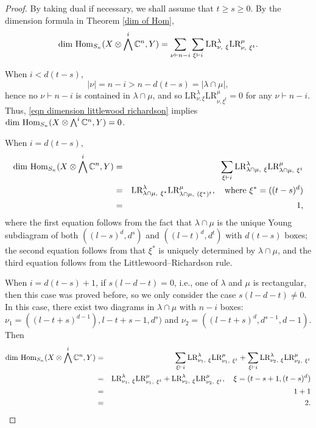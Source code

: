 \documentclass[11pt]{amsart}
\numberwithin{equation}{section}
\theoremstyle{definition}
\begin{document}
\begin{proof}
By taking dual if necessary, we shall assume that $t\geq s\geq 0$. By the dimension formula in Theorem \ref{dim of Hom},
    \begin{equation}
           \textnormal{dim}\ \textnormal{Hom}_{S_{n}}(X\otimes\bigwedge^{i}\mathbb{C}^{n}, Y)= \sum\limits_{\nu\vdash n-i}\sum\limits_{\xi\vdash i} \textnormal{LR}^{\lambda}_{\nu,\ \xi}\textnormal{LR}^{\mu}_{\nu,\ \xi^{t}}.
        \label{eqn dimension littlewood richardson}
        \end{equation}
        
When $i<d(t-s)$, 
\[ |\nu|=n-i>n-d(t-s)=|\lambda\cap \mu|, \]
hence no $\nu\vdash n-i$ is contained in $\lambda\cap \mu$, and so \( \mathrm{LR}^\lambda_{\nu, \xi}\mathrm{LR}^\mu_{\nu, \xi^t}=0\) for any \( \nu \vdash n-i\). Thus, \eqref{eqn dimension littlewood richardson} implies $\textnormal{dim}\ \textnormal{Hom}_{S_{n}}(X\otimes\bigwedge^{i}\mathbb{C}^{n}, Y)=0$.

When $i=d(t-s)$, 
\begin{eqnarray*}
   \textnormal{dim}\ \textnormal{Hom}_{S_{n}}(X\otimes\bigwedge^{i}\mathbb{C}^{n}, Y)
   &=& \sum\limits_{\xi\vdash i} \textnormal{LR}^{\lambda}_{\lambda\cap \mu,\ \xi}\textnormal{LR}^{\mu}_{\lambda\cap \mu,\ \xi^{t}}\\
   &=& \textnormal{LR}^{\lambda}_{\lambda\cap \mu,\ \xi^*}\textnormal{LR}^{\mu}_{\lambda\cap \mu,\ (\xi^*)^{t}},\quad \textnormal{where } \xi^*=((t-s)^{d})\\
   &=& 1 ,
\end{eqnarray*}
where the first equation follows from the fact that $\lambda\cap \mu$ is the unique Young subdiagram of both $((l-s)^d,d^s)$ and $((l-t)^d, d^t)$ with $d(t-s)$ boxes; the second equation follows from that $\xi^*$ is uniquely determined by $\lambda\cap \mu$, and the third equation follows from the Littlewoord--Richardson rule.

     
When $i=d(t-s)+1$, if $s(l-d-t)=0$, i.e., one of $\lambda$ and $\mu$ is rectangular, then this case was proved before, so we only consider the case $s(l-d-t)\neq0$. In this case, there exist two diagrams in $\lambda\cap \mu$ with $n-i$ boxes: $\nu_{1}=((l-t+s)^{d-1}),l-t+s-1,d^{s})$ and $\nu_{2}=((l-t+s)^{d},d^{s-1},d-1)$. Then 
\begin{eqnarray*}
   \textnormal{dim}\ \textnormal{Hom}_{S_{n}}(X\otimes\bigwedge^{i}\mathbb{C}^{n}, Y)
   &=& \sum\limits_{\xi\vdash i} \textnormal{LR}^{\lambda}_{\nu_{1},\ \xi}\textnormal{LR}^{\mu}_{\nu_{1},\ \xi^{t}}
   +\sum\limits_{\xi\vdash i} \textnormal{LR}^{\lambda}_{\nu_{2},\ \xi}\textnormal{LR}^{\mu}_{\nu_{2},\ \xi^{t}}\\
   &=& \textnormal{LR}^{\lambda}_{\nu_{1},\ \xi}\textnormal{LR}^{\mu}_{\nu_{1},\ \xi^{t}}+\textnormal{LR}^{\lambda}_{\nu_{2},\ \xi}\textnormal{LR}^{\mu}_{\nu_{2},\ \xi^{t}},\quad \xi=(t-s+1,(t-s)^{d})\\
   &=& 1+1\\
   &=& 2.
\end{eqnarray*}
\end{proof}
\end{document}
